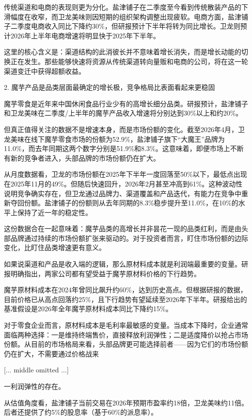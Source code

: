 \documentclass[11pt]{ctexart}
\begin{document}
传统渠道和电商的表现则更为分化。盐津铺子在二季度至今看到传统散装产品的下滑幅度在收窄，而卫龙美味则因短期的组织架构调整出现疲软。电商方面，盐津铺子二季度电商收入同比下降约30\%，但研报预计下半年将转为同比增长。卫龙则预计2026年上半年电商增速将明显快于2025年下半年。

这里的核心含义是：渠道结构的此消彼长并不意味着增长消失，而是增长动能的切换正在发生。那些能够快速将资源从传统渠道转向量贩和电商的公司，将在这一轮渠道变迁中获得超额收益。

2. 魔芋产品是品类层面最确定的增长极，竞争格局比表面看起来更稳固

魔芋零食是近年来中国休闲食品行业少有的高增长细分品类。研报预计，盐津铺子和卫龙美味在二季度/上半年的魔芋产品收入增速将分别达到30\%以上和约20\%。

但真正值得关注的数据不是增速本身，而是市场份额的变化。截至2026年4月，卫龙美味在线下魔芋零食市场的份额为52.9\%，盐津铺子旗下“大魔王”品牌为11.0\%，而去年同期这两个数字分别是51.9\%和8.3\%。这意味着，即便市场上不断有新的竞争者进入，头部品牌的市场份额仍在扩大。

从月度数据看，卫龙的市场份额在2025年下半年一度回落至50\%以下，最低点出现在2025年11月的49\%。但随后快速回升，2026年2月甚至冲高到61\%。这种波动性说明竞争确实存在，但卫龙通过品牌力、渠道覆盖和产品迭代，有能力在竞争中重新夺回份额。盐津铺子的份额则从去年同期的8.3\%稳步提升至11.0\%，在10\%的水平上保持了近一年的稳定性。

这份数据合在一起意味着：魔芋品类的高增长并非昙花一现的品类红利，而是由头部品牌通过持续的市场份额扩张来驱动的。对于投资者而言，盯住市场份额的边际变化，比盯住品类增速更有意义。

如果说渠道和产品是收入端的逻辑，那么原材料成本就是利润端最重要的变量。研报明确指出，两家公司都有望受益于魔芋原材料价格的下行趋势。

魔芋原材料成本在2024年曾同比飙升约60\%，达到历史高点。但根据研报的数据，目前价格已从高点回落约25\%，且下行趋势有望延续至2026年下半年。研报给出的基准假设是2026年全年魔芋原材料成本同比下降约15\%。

对于零食企业而言，原材料成本是毛利率最敏感的变量。当成本下降时，企业通常面临两种选择：一是维持终端售价，直接释放利润弹性；二是适度降价以抢占市场份额。从目前的市场格局来看，头部品牌更可能选择前者——因为它们的市场份额仍在扩大，不需要通过价格战来

[... middle omitted ...]

一利润弹性的存在。

从估值角度看，盐津铺子当前交易在2026年预期市盈率约18倍，卫龙美味约11倍。后者还提供了约5\%的股息率（基于60\%的派息率）。
\end{document}
